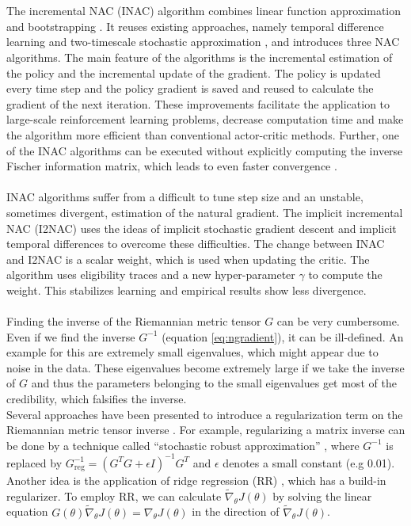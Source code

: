 \\\\
 The incremental NAC (INAC) algorithm combines linear function approximation and bootstrapping \citep{bhatnagar2008incremental}. It reuses existing approaches, namely temporal difference learning \citep{sutton2018reinforcement} and two-timescale stochastic approximation \citep{bhatnagar1998two}, and introduces three NAC algorithms. The main feature of the algorithms is the incremental estimation of the policy and the incremental update of the gradient. The policy is updated every time step and the policy gradient is saved and reused to calculate the gradient of the next iteration. These improvements facilitate the application to large-scale reinforcement learning problems, decrease computation time and make the algorithm more efficient than conventional actor-critic methods. Further, one of the INAC algorithms can be executed without explicitly computing the inverse Fischer information matrix, which leads to even faster convergence \citep{bhatnagar2008incremental}.
\\\\
 INAC algorithms suffer from a difficult to tune step size and an unstable, sometimes divergent, estimation of the natural gradient. The implicit incremental NAC (I2NAC) \citep{iwaki2019implicit} uses the ideas of implicit stochastic gradient descent \citep{toulis2014statistical} and implicit temporal differences \citep{tamar2014implicit} to overcome these difficulties. The change between INAC and I2NAC is a scalar weight, which is used when updating the critic. The algorithm uses eligibility traces and a new hyper-parameter $\gamma$ to compute the weight. This stabilizes learning and empirical results show less divergence.
\\\\
 Finding the inverse of the Riemannian metric tensor $G$ can be very cumbersome. Even if we find the inverse $G^{-1}$ (equation \ref{eq:ngradient}), it can be ill-defined. An example for this are extremely small eigenvalues, which might appear due to noise in the data. These eigenvalues become extremely large if we take the inverse of $G$ and thus the parameters belonging to the small eigenvalues get most of the credibility, which falsifies the inverse.
\\
\indent Several approaches have been presented to introduce a regularization term on the Riemannian metric tensor inverse \cite{sohl2012natural, witsch2011enhancing}. For example, regularizing a matrix inverse can be done by a technique called ``stochastic robust approximation'' \cite{boyd2004convex}, where $G^{-1}$ is replaced by \(G^{-1}_{\text{reg}} = \left( G^T G + \epsilon I \right)^{-1} G^T\) and $\epsilon$ denotes a small constant (e.g 0.01).
\\
\indent Another idea is the application of ridge regression (RR) \cite{hoerl1970ridge}, which has a build-in regularizer. To employ RR, we can calculate $\widetilde{\nabla}_{\theta} J(\theta)$ by solving the linear equation \(G(\theta) \widetilde{\nabla}_{\theta} J(\theta) = \nabla_{\theta} J(\theta)\) in the direction of $\widetilde{\nabla}_{\theta} J(\theta)$.

